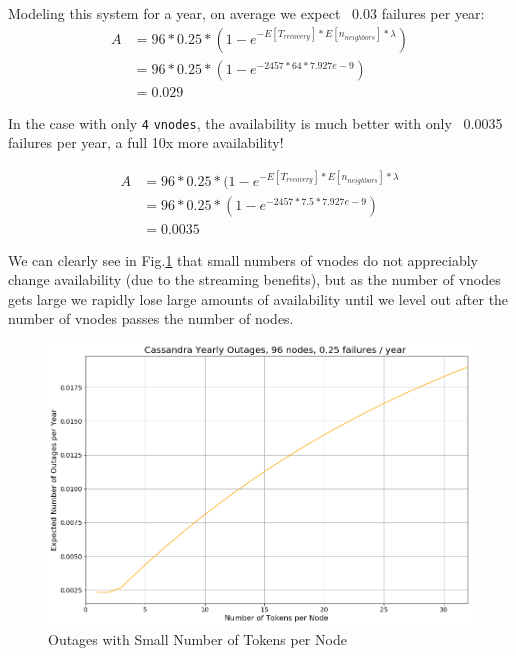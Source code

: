 \documentclass{article}
\begin{document}
Modeling this system for a year, on average we expect ~0.03 failures per year:
\begin{equation}
    \begin{split}
    A & = 96 * 0.25 * (1 - e^{-E[T_{recovery}] * E[n_{neighbors}] * \lambda}) \\
    & = 96 * 0.25 * (1 - e^{-2457 * 64 * 7.927e-9}) \\
    & = 0.029
    \end{split}
\end{equation}

In the case with only \texttt{4} \texttt{vnodes}, the availability is much better with only ~0.0035 failures per year, a full 10x more availability!

\begin{equation}
    \begin{split}
    A & = 96 * 0.25 * (1 - e^{-E[T_{recovery}] * E[n_{neighbors}] * \lambda} \\
    & = 96 * 0.25 * (1 - e^{-2457 * 7.5 * 7.927e-9}) \\
    & = 0.0035
    \end{split}
\end{equation}


We can clearly see in Fig.\ref{fig:outages_small_vnodes} that small numbers of vnodes do not appreciably change availability (due to the streaming benefits), but as the number of vnodes gets large we rapidly lose large amounts of availability until we level out after the number of vnodes passes the number of nodes.
 
\begin{figure}[h!]
    \centering
    \includegraphics[width=1.0\textwidth]{images/outages_vnodes_small.png}
    \caption{Outages with Small Number of Tokens per Node}
    \label{fig:outages_small_vnodes}
\end{figure}
\end{document}
